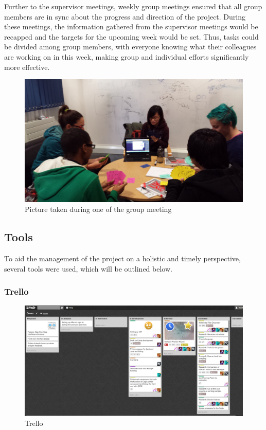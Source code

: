 \documentclass[11pt, a4paper]{article}
\begin{document}
Further to the supervisor meetings, weekly group meetings ensured that all group members are in sync about the progress and direction of the project. 
During these meetings, the information gathered from the supervisor meetings would be recapped and the targets for the upcoming week would be set. 
Thus, tasks could be divided among group members, with everyone knowing what their colleagues are working on in this week, making group and individual efforts significantly more effective.
\begin{figure}[h!]
\centering
\includegraphics[width=130mm]{estimation.jpg}
\caption{Picture taken during one of the group meeting}
\end{figure}

\subsection{Tools}

To aid the management of the project on a holistic and timely perspective, several tools were used, which will be outlined below.

\subsubsection{Trello}
\begin{figure}[h!]
\centering
\includegraphics[width=\textwidth]{Trello.png}
\caption{Trello}
\label{fig:Trello}
\end{figure}
\end{document}
